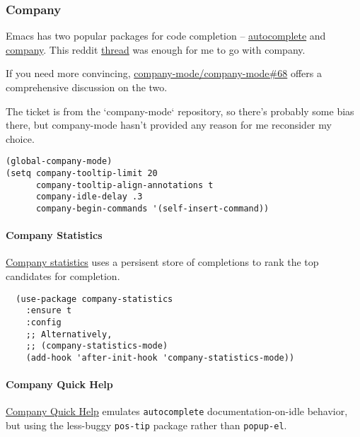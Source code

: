 \documentclass[11pt]{article}
\begin{document}
\subsubsection*{Company}
\label{sec:orgb36c712}

Emacs has two popular packages for code completion --
\href{https://github.com/auto-complete/auto-complete}{autocomplete} and \href{https://github.com/company-mode/company-mode}{company}. This reddit \href{https://www.reddit.com/r/emacs/comments/2ekw22/autocompletemode\_vs\_companymode\_which\_is\_better/}{thread} was enough for
me to go with company.

If you need more convincing, \href{https://github.com/company-mode/company-mode/issues/68}{company-mode/company-mode\#68}
offers a comprehensive discussion on the two.

The ticket is from the ‘company-mode‘ repository, so there's
probably some bias there, but company-mode hasn't provided
any reason for me reconsider my choice.

\begin{verbatim}
(global-company-mode)
(setq company-tooltip-limit 20
      company-tooltip-align-annotations t
      company-idle-delay .3
      company-begin-commands '(self-insert-command))
\end{verbatim}

\paragraph*{Company Statistics}
\label{sec:org6ade7f2}

\href{https://github.com/company-mode/company-statistics}{Company statistics} uses a persisent store of completions to rank the
top candidates for completion.

\begin{verbatim}
  (use-package company-statistics
    :ensure t
    :config
    ;; Alternatively,
    ;; (company-statistics-mode)
    (add-hook 'after-init-hook 'company-statistics-mode))
\end{verbatim}

\paragraph*{Company Quick Help}
\label{sec:org2a6afa7}

\href{https://github.com/expez/company-quickhelp}{Company Quick Help} emulates \texttt{autocomplete} documentation-on-idle behavior, but using the
less-buggy \texttt{pos-tip} package rather than \texttt{popup-el}.
\end{document}
